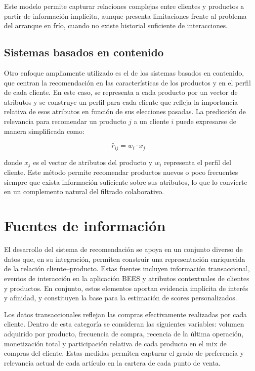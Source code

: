 Este modelo permite capturar relaciones complejas entre clientes y productos a partir de información implícita, aunque presenta limitaciones frente al problema del arranque en frío, cuando no existe historial suficiente de interacciones.

\subsection{Sistemas basados en contenido}

Otro enfoque ampliamente utilizado es el de los sistemas basados en contenido, que centran la recomendación en las características de los productos y en el perfil de cada cliente. En este caso, se representa a cada producto por un vector de atributos y se construye un perfil para cada cliente que refleja la importancia relativa de esos atributos en función de sus elecciones pasadas. La predicción de relevancia para recomendar un producto $j$ a un cliente $i$ puede expresarse de manera simplificada como:

\begin{equation}
\label{eq:prediccion_cb}
\hat{r}_{ij} = w_i \cdot x_j
\end{equation}

donde $x_j$ es el vector de atributos del producto y $w_i$ representa el perfil del cliente. Este método permite recomendar productos nuevos o poco frecuentes siempre que exista información suficiente sobre sus atributos, lo que lo convierte en un complemento natural del filtrado colaborativo.


\section{Fuentes de información}

El desarrollo del sistema de recomendación se apoya en un conjunto diverso de datos que, en su integración, permiten construir una representación enriquecida de la relación cliente–producto. Estas fuentes incluyen información transaccional, eventos de interacción en la aplicación BEES y atributos contextuales de clientes y productos. En conjunto, estos elementos aportan evidencia implícita de interés y afinidad, y constituyen la base para la estimación de scores personalizados.

Los datos transaccionales reflejan las compras efectivamente realizadas por cada cliente. Dentro de esta categoría se consideran las siguientes variables: volumen adquirido por producto, frecuencia de compra, recencia de la última operación, monetización total y participación relativa de cada producto en el mix de compras del cliente. Estas medidas permiten capturar el grado de preferencia y relevancia actual de cada artículo en la cartera de cada punto de venta.

